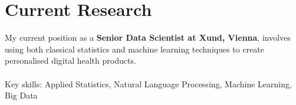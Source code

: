 \section{Current Research}
\noindent My current position as a \textbf{Senior Data Scientist at Xund, Vienna}, involves using both classical statistics and machine learning techniques to create personalised digital health products.\\ \\
Key skills: Applied Statistics, Natural Language Processing, Machine Learning, Big Data
